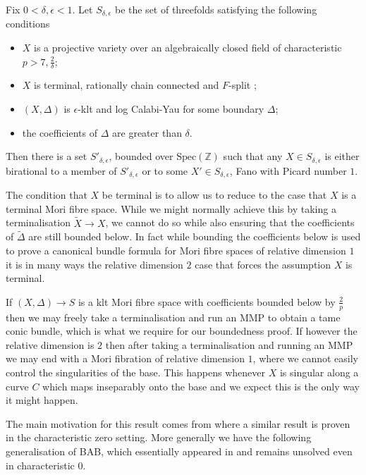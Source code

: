 \documentclass[a4paper,12pt]{book}
\newcommand{\D}{\Delta}
\begin{document}
	\begin{theorem}\label{Main}
		Fix $0 < \delta, \epsilon <1$. Let $S_{\delta,\epsilon}$ be the set of threefolds satisfying the following conditions
		\begin{itemize}
			\item $X$ is a projective variety over an algebraically closed field of characteristic $p >7, \frac{2}{\delta}$;
			\item $X$ is terminal, rationally chain connected and $F$-split ;
			\item $(X,\Delta)$ is $\epsilon$-klt and log Calabi-Yau for some boundary $\Delta$;
			\item the coefficients of $\Delta$ are greater than $\delta$.
		\end{itemize}
		
		Then there is a set $S'_{\delta,\epsilon}$, bounded over $\text{Spec}(\mathbb{Z})$ such that any $X\in S_{\delta,\epsilon}$ is either birational to a member of $S'_{\delta,\epsilon}$ or to some $X'\in S_{\delta,\epsilon}$, Fano with Picard number $1$. 
	\end{theorem}
	\begin{remark}
		The condition that $X$ be terminal is to allow us to reduce to the case that $X$ is a terminal Mori fibre space. While we might normally achieve this by taking a terminalisation $\tilde{X} \to X$, we cannot do so while also ensuring that the coefficients of $\tilde{\D}$ are still bounded below. In fact while bounding the coefficients below is used to prove a canonical bundle formula for Mori fibre spaces of relative dimension $1$ it is in many ways the relative dimension $2$ case that forces the assumption $X$ is terminal.
		
		If $(X,\Delta) \to S$ is a klt Mori fibre space with coefficients bounded below by $\frac{2}{p}$ then we may freely take a terminalisation and run an MMP to obtain a tame conic bundle, which is what we require for our boundedness proof. If however the relative dimension is $2$ then after taking a terminalisation and running an MMP we may end with a Mori fibration of relative dimension $1$, where we cannot easily control the singularities of the base. This happens whenever $X$ is singular along a curve $C$ which maps inseparably onto the base and we expect this is the only way it might happen. 
	\end{remark}

	The main motivation for this result comes from \cite{chen2018birational} where a similar result is proven in the characteristic zero setting. More generally we have the following generalisation of BAB, which essentially appeared in \cite{mckernan2003threefold} and remains unsolved even in characteristic $0$. 
	 
\end{document}
